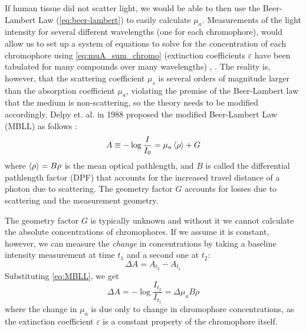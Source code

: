 If human tissue did not scatter light, we would be able to then use the Beer-Lambert Law (\autoref{eq:beer-lambert}) to easily calculate $\mu_a$. Measurements of the light intensity for several different wavelengths (one for each chromophore), would allow us to set up a system of equations to solve for the concentration of each chromophore using \autoref{eq:muA_sum_chromo} (extinction coefficients $\varepsilon$ have been tabulated for many compounds over many wavelengths) \cite[ch. 2]{Madsen2013}, \cite[ch. 5]{Handbook}. The reality is, however, that the scattering coefficient $\mu_s$ is several orders of magnitude larger than the absorption coefficient $\mu_a$, violating the premise of the Beer-Lambert law that the medium is non-scattering, so the theory needs to be modified accordingly. Delpy et. al. in 1988 proposed the modified Beer-Lambert Law (MBLL) as follows \cite{Delpy1988}:
\begin{equation} \label{eq:MBLL}
A \equiv -\log\frac{I}{I_0} = \mu_a\expval{\rho} + G
\end{equation}
where $\expval{\rho} = B\rho$ is the mean optical pathlength, and $B$ is called the differential pathlength factor (DPF) that accounts for the increased travel distance of a photon due to scattering. The geometry factor $G$ accounts for losses due to scattering and the measurement geometry. 

The geometry factor $G$ is typically unknown and without it we cannot calculate the absolute concentrations of chromophores. If we assume it is constant, however, we can measure the \emph{change} in concentrations by taking a baseline intensity measurement at time $t_1$ and a second one at $t_2$:
\begin{equation}
\Delta A = A_{t_2}-A_{t_1}
\end{equation}
Substituting \autoref{eq:MBLL}, we get
\begin{equation}
\Delta A = -\log\frac{I_{t_2}}{I_{t_1}} = \Delta\mu_aB\rho
\end{equation}
where the change in $\mu_a$ is due only to change in chromophore concentrations, as the extinction coefficient $\varepsilon$ is a constant property of the chromophore itself.

